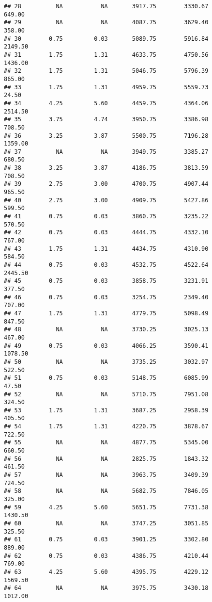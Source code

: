 \documentclass[]{article}
\begin{document}
\begin{verbatim}
## 28          NA           NA       3917.75        3330.67      649.00
## 29          NA           NA       4087.75        3629.40      358.00
## 30        0.75         0.03       5089.75        5916.84     2149.50
## 31        1.75         1.31       4633.75        4750.56     1436.00
## 32        1.75         1.31       5046.75        5796.39      865.00
## 33        1.75         1.31       4959.75        5559.73       24.50
## 34        4.25         5.60       4459.75        4364.06     2514.50
## 35        3.75         4.74       3950.75        3386.98      708.50
## 36        3.25         3.87       5500.75        7196.28     1359.00
## 37          NA           NA       3949.75        3385.27      680.50
## 38        3.25         3.87       4186.75        3813.59      708.50
## 39        2.75         3.00       4700.75        4907.44      965.50
## 40        2.75         3.00       4909.75        5427.86      599.50
## 41        0.75         0.03       3860.75        3235.22      570.50
## 42        0.75         0.03       4444.75        4332.10      767.00
## 43        1.75         1.31       4434.75        4310.90      584.50
## 44        0.75         0.03       4532.75        4522.64     2445.50
## 45        0.75         0.03       3858.75        3231.91      377.50
## 46        0.75         0.03       3254.75        2349.40      707.00
## 47        1.75         1.31       4779.75        5098.49      847.50
## 48          NA           NA       3730.25        3025.13      467.00
## 49        0.75         0.03       4066.25        3590.41     1078.50
## 50          NA           NA       3735.25        3032.97      522.50
## 51        0.75         0.03       5148.75        6085.99       47.50
## 52          NA           NA       5710.75        7951.08      324.50
## 53        1.75         1.31       3687.25        2958.39      405.50
## 54        1.75         1.31       4220.75        3878.67      722.50
## 55          NA           NA       4877.75        5345.00      660.50
## 56          NA           NA       2825.75        1843.32      461.50
## 57          NA           NA       3963.75        3409.39      724.50
## 58          NA           NA       5682.75        7846.05      325.00
## 59        4.25         5.60       5651.75        7731.38     1430.50
## 60          NA           NA       3747.25        3051.85      325.50
## 61        0.75         0.03       3901.25        3302.80      889.00
## 62        0.75         0.03       4386.75        4210.44      769.00
## 63        4.25         5.60       4395.75        4229.12     1569.50
## 64          NA           NA       3975.75        3430.18     1012.00

\end{verbatim}
\end{document}
